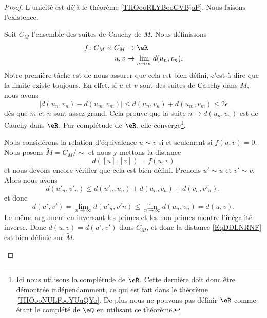 \begin{proof}
	L'unicité est déjà le théorème \ref{THOooRLYBooCVBjoP}. Nous faisons l'existence.
	\begin{subproof}
		\spitem[Existence]

		Soit \( C_M\) l'ensemble des suites de Cauchy de \( M\). Nous définissons
		\begin{equation}
			\begin{aligned}
				f\colon C_M\times C_M & \to \eR                                \\
				u,v                   & \mapsto \lim_{n\to \infty} d(u_n,v_n).
			\end{aligned}
		\end{equation}
		Notre première tâche est de nous assurer que cela est bien défini, c'est-à-dire que la limite existe toujours. En effet, si \( u\) et \( v\) sont des suites de Cauchy dans \( M\), nous avons
		\begin{equation}
			\left| d(u_n,v_n)-d(u_m,v_m) \right| \leq d(u_n,v_n)+d(u_m,v_m)\leq 2\epsilon
		\end{equation}
		dès que \( m\) et \( n\) sont assez grand. Cela prouve que la suite \( n\mapsto d(u_n,v_n)\) est de Cauchy dans \( \eR\). Par complétude de \( \eR\), elle converge\footnote{Ici nous utilisons la complétude de \( \eR\). Cette dernière doit donc être démontrée indépendamment, ce qui est fait dans le théorème \ref{THOooNULFooYUqQYo}. De plus nous ne pouvons pas définir \( \eR\) comme étant le complété de \( \eQ\) en utilisant ce théorème.}.

		Nous considérons la relation d'équivalence \( u\sim v\) si et seulement si \( f(u,v)=0\). Nous posons \( \tilde M=C_M/\sim\) et nous y mettons la distance
		\begin{equation}    \label{EqDDLNRNF}
			d( [u],[v]  )=f(u,v)
		\end{equation}
		et nous devons encore vérifier que cela est bien défini. Prenons \( u'\sim u\) et \( v'\sim v\). Alors nous avons
		\begin{equation}
			d(u'_n,v'_n)\leq d(u'_n,u_n)+d(u_n,v_n)+d(v_n,v'_n),
		\end{equation}
		et donc
		\begin{equation}
			d(u',v')=\lim_{n\to \infty} d(u'_n,v'n)\leq \lim_{n\to \infty} d(u_n,v_n)=d(u,v).
		\end{equation}
		Le même argument en inversant les primes et les non primes montre l'inégalité inverse. Donc \( d(u,v)=d(u',v')\) dans \( C_M\), et donc la distance \eqref{EqDDLNRNF} est bien définie sur \( \tilde M\).


\end{subproof}
\end{proof}
